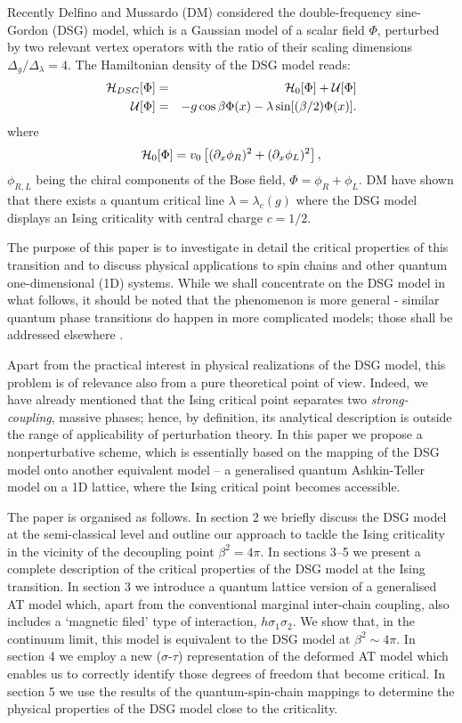 Recently Delfino and Mussardo (DM)\cite{DM} considered
the double-frequency sine-Gordon (DSG) model, which is a
Gaussian model of a scalar field $\Phi$,
perturbed by two relevant vertex operators with
the ratio of their scaling dimensions $\Delta_g/\Delta_{\lambda}=4$.
The Hamiltonian density of the DSG model reads:
\begin{eqnarray}
{\cal{H}}_{DSG}[\Phi] &=& {\cal{H}}_0[\Phi] + {\cal{U}}[\Phi]\nonumber\\ 
{\cal{U}}[\Phi] &=&
- g\cos\beta\Phi(x)-\lambda\sin[(\beta/2)\Phi(x)].
\label{HDSG}
\end{eqnarray}
where
\begin{equation}
{\cal{H}}_0[\Phi]=v_0\left[ (\partial_x\phi_R)^2+(\partial_x\phi_L)^2\right],
\label{HPhifree}
\end{equation}
$\phi_{R,L}$ being the chiral components of the Bose field,
$\Phi=\phi_R+\phi_L$.
DM have shown that there exists a quantum critical
line $\lambda=\lambda_c(g)$ where the DSG model displays
an Ising criticality with central charge $c=1/2$.

The purpose of this paper is to investigate in detail
the critical properties of this
transition and to discuss physical applications
to spin chains and other quantum one-dimensional (1D)
systems. While we shall concentrate on the DSG model in what follows,
it should be noted that the phenomenon is more general - similar quantum
phase transitions do happen in more complicated models;
those shall be addressed elsewhere \cite{else}.

Apart from the practical interest in physical realizations of the DSG model,
this problem is of relevance also from a pure
theoretical point of view. Indeed,
we have already mentioned that the Ising critical point separates
two {\sl strong-coupling}, massive phases; hence, by definition,
its analytical description is outside the range of applicability
of perturbation theory. In this paper we propose a nonperturbative
scheme, which is essentially based on the mapping of the DSG model onto
another equivalent model -- a generalised quantum Ashkin-Teller model
on a 1D lattice, where the Ising critical point becomes accessible.

The paper is organised as follows. In section 2 we briefly discuss
the DSG model at the semi-classical level and outline our approach
to tackle the Ising criticality in the vicinity of the decoupling
point $\beta^2 = 4\pi$.
In sections 3--5 we present
a complete description of the critical properties of the DSG model
at the Ising transition.
In section 3 we introduce a quantum lattice
version of a generalised AT model which, apart from
the conventional marginal inter-chain coupling, also includes a
`magnetic filed' type of interaction, $h \sigma_1 \sigma_2$. We show that,
in the continuum limit, this model is equivalent to the DSG model
at $\beta^2 \sim 4\pi$. In section 4 we employ a new
($\sigma$-$\tau$) representation of the deformed AT model
which enables us
to correctly identify those degrees of freedom that become critical. 
In section 5
we use the results of the quantum-spin-chain mappings to determine
the physical properties of the DSG model close to the criticality.


